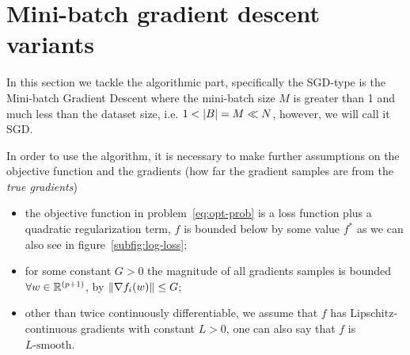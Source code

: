 \section{Mini-batch gradient descent variants}\label{sc:sgds}

In this section we tackle the algorithmic part, specifically the SGD-type is the Mini-batch Gradient Descent where the mini-batch size $M$ is greater than 1 and much less than the dataset size, i.e. $1<\lvert B\rvert=M\ll N$, however, we will call it SGD.



In order to use the algorithm, it is necessary to make further assumptions on the objective function and the gradients (how far the gradient samples are from the \emph{true gradients})
\begin{itemize}
\item the objective function in problem~\ref{eq:opt-prob} is a loss function plus a quadratic regularization term, $f$ is bounded below by some value $f^\ast$ as we can also see in figure~\ref{subfig:log-loss};
\item for some constant $G>0$ the magnitude of all gradients samples is bounded $\forall w\in\mathbb{R}^{(p+1)}$, by $\lVert\nabla f_i(w)\rVert\leq G$;
\item other than twice continuously differentiable, we assume that $f$ has Lipschitz-continuous gradients with constant $L>0$, one can also say that $f$ is $L\text{-smooth}$.
\end{itemize}

